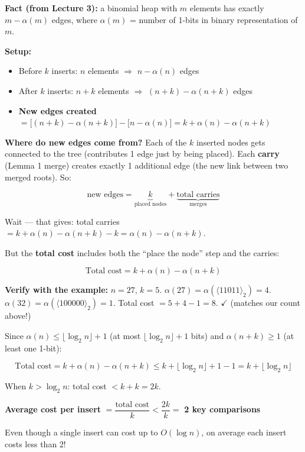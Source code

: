\documentclass[11pt]{article}
\begin{document}
\begin{keybox}
\textbf{Fact (from Lecture 3):} a binomial heap with $m$ elements has exactly $m - \alpha(m)$ edges, where $\alpha(m)$ = number of 1-bits in binary representation of $m$.

\textbf{Setup:}
\begin{itemize}[leftmargin=1.4em,itemsep=2pt]
    \item Before $k$ inserts: $n$ elements $\Rightarrow$ $n - \alpha(n)$ edges
    \item After $k$ inserts: $n + k$ elements $\Rightarrow$ $(n+k) - \alpha(n+k)$ edges
    \item \textbf{New edges created} $= \bigl[(n+k) - \alpha(n+k)\bigr] - \bigl[n - \alpha(n)\bigr] = k + \alpha(n) - \alpha(n+k)$
\end{itemize}

\textbf{Where do new edges come from?} Each of the $k$ inserted nodes gets connected to the tree (contributes 1 edge just by being placed). Each \textbf{carry} (Lemma 1 merge) creates exactly 1 additional edge (the new link between two merged roots). So:

$$\text{new edges} = \underbrace{k}_{\text{placed nodes}} + \underbrace{\text{total carries}}_{\text{merges}}$$

Wait — that gives: total carries $= k + \alpha(n) - \alpha(n+k) - k = \alpha(n) - \alpha(n+k)$.

But the \textbf{total cost} includes both the ``place the node'' step and the carries:

$$\boxed{\text{Total cost} = k + \alpha(n) - \alpha(n+k)}$$
\end{keybox}

\textbf{Verify with the example:} $n=27$, $k=5$. $\alpha(27) = \alpha(\langle 11011 \rangle_2) = 4$. $\alpha(32) = \alpha(\langle 100000 \rangle_2) = 1$. Total cost $= 5 + 4 - 1 = 8$. $\checkmark$ (matches our count above!)

\begin{defbox}
Since $\alpha(n) \leq \lfloor \log_2 n \rfloor + 1$ (at most $\lfloor \log_2 n \rfloor + 1$ bits) and $\alpha(n+k) \geq 1$ (at least one 1-bit):

$$\text{Total cost} = k + \alpha(n) - \alpha(n+k) \leq k + \lfloor \log_2 n \rfloor + 1 - 1 = k + \lfloor \log_2 n \rfloor$$

When $k > \log_2 n$: total cost $< k + k = 2k$.

\medskip
\textcolor{greenO}{\textbf{Average cost per insert}} $= \dfrac{\text{total cost}}{k} < \dfrac{2k}{k} = $ \textcolor{greenO}{\textbf{2 key comparisons}}

Even though a single insert can cost up to $O(\log n)$, on average each insert costs less than 2!
\end{defbox}
\end{document}
